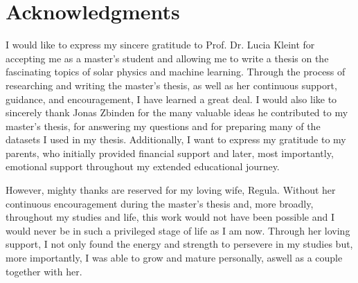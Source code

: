 \documentclass[a4paper,12pt]{report}
\begin{document}

\chapter*{Acknowledgments}
I would like to express my sincere gratitude to Prof. Dr. Lucia Kleint for accepting me as a master's student and allowing me to write a thesis on the fascinating topics of solar physics and machine learning. Through the process of researching and writing the master's thesis, as well as her continuous support, guidance, and encouragement, I have learned a great deal. I would also like to sincerely thank Jonas Zbinden for the many valuable ideas he contributed to my master's thesis, for answering my questions and for preparing many of the datasets I used in my thesis. Additionally, I want to express my gratitude to my parents, who initially provided financial support and later, most importantly, emotional support throughout my extended educational journey.

However, mighty thanks are reserved for my loving wife, Regula. Without her continuous encouragement during the master's thesis and, more broadly, throughout my studies and life, this work would not have been possible and I would never be in such a privileged stage of life as I am now. Through her loving support, I not only found the energy and strength to persevere in my studies but, more importantly, I was able to grow and mature personally, aswell as a couple together with her.



\end{document}
